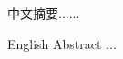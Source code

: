 \begin{cabstract}%
中文摘要......
\end{cabstract}

    
\begin{eabstract}%
English Abstract ...
\end{eabstract}

    